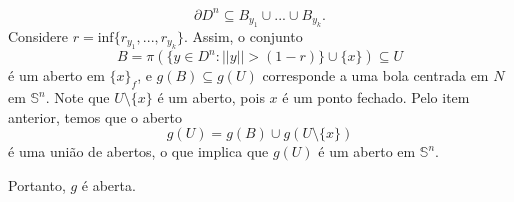 \begin{dem}
\begin{itemize}
        \[\partial D^n\subseteq B_{y_1}\cup...\cup B_{y_k}.\]
        Considere $r=\text{inf}\{r_{y_1},...,r_{y_k}\}$. Assim, o conjunto 
        \[B=\pi(\{y\in D^n: ||y||>(1-r)\}\cup\{x\})\subseteq U\]
        é um aberto em $\{x\}_f$, e $g(B)\subseteq g(U)$ corresponde a uma bola centrada em $N$ em $\mathbb{S}^n$. Note que $U\setminus \{x\}$ é um aberto, pois $x$ é um ponto fechado. Pelo item anterior, temos que o aberto
        \[g(U)=g(B)\cup g(U\setminus\{x\})\]
        é uma união de abertos, o que implica que $g(U)$ é um aberto em $\mathbb{S}^n$.
    \end{itemize} 
    Portanto, $g$ é aberta.
\end{dem}

